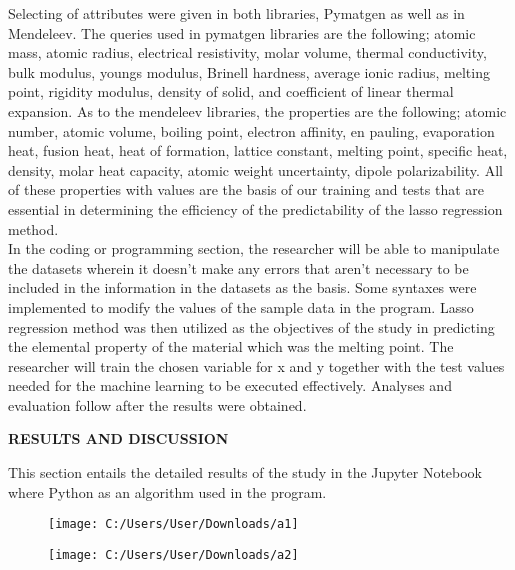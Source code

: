 \documentclass[12pt]{article}
\begin{document}
Selecting of attributes were given in both libraries, Pymatgen as well as in Mendeleev. The queries used in pymatgen libraries are the following; atomic mass, atomic radius, electrical resistivity, molar volume, thermal conductivity, bulk modulus, youngs modulus, Brinell hardness, average ionic radius, melting point, rigidity modulus, density of solid, and coefficient of linear thermal expansion. As to the mendeleev libraries, the properties are the following; atomic number, atomic volume, boiling point, electron affinity, en pauling, evaporation heat, fusion heat, heat of formation, lattice constant, melting point, specific heat, density, molar heat capacity, atomic weight uncertainty, dipole polarizability. All of these properties with values are the basis of our training and tests that are essential in determining the efficiency of the predictability of the lasso regression method.\\
\indent In the coding or programming section, the researcher will be able to manipulate the datasets wherein it doesn’t make any errors that aren’t necessary to be included in the information in the datasets as the basis. Some syntaxes were implemented to modify the values of the sample data in the program. Lasso regression method was then utilized as the objectives of the study in predicting the elemental property of the material which was the melting point. The researcher will train the chosen variable for x and y together with the test values needed for the machine learning to be executed effectively. Analyses and evaluation follow after the results were obtained.\\

\newpage
\begin{center}
\textbf{RESULTS AND DISCUSSION}
\end{center}

This section entails the detailed results of the study in the Jupyter Notebook where Python as an algorithm used in the program.\\
\vspace{-10mm}
\begin{figure}[h!]
	\centering
	\texttt{[image: C:/Users/User/Downloads/a1]}
\end{figure}
\vspace{-10mm} 
\begin{figure}[h!]
	\centering
	\texttt{[image: C:/Users/User/Downloads/a2]}
\end{figure}
\vspace{-6mm}
\end{document}
